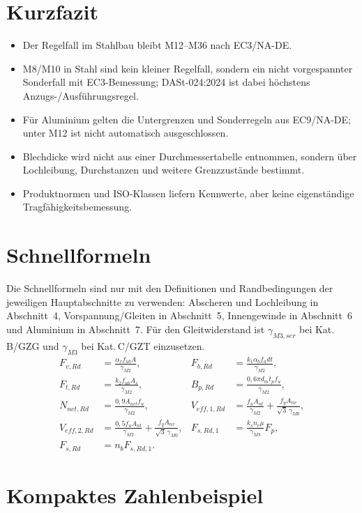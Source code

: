 \documentclass[10pt,a4paper]{article}
\begin{document}
\section{Kurzfazit}
\begin{itemize}
\item Der Regelfall im Stahlbau bleibt M12--M36 nach EC3/NA-DE.
\item M8/M10 in Stahl sind kein kleiner Regelfall, sondern ein nicht vorgespannter Sonderfall mit EC3-Bemessung; DASt-024:2024 ist dabei höchstens Anzugs-/Ausführungsregel.
\item Für Aluminium gelten die Untergrenzen und Sonderregeln aus EC9/NA-DE; unter M12 ist nicht automatisch ausgeschlossen.
\item Blechdicke wird nicht aus einer Durchmessertabelle entnommen, sondern über Lochleibung, Durchstanzen und weitere Grenzzustände bestimmt.
\item Produktnormen und ISO-Klassen liefern Kennwerte, aber keine eigenständige Tragfähigkeitsbemessung.
\end{itemize}

\appendix
\section{Schnellformeln}
Die Schnellformeln sind nur mit den Definitionen und Randbedingungen der jeweiligen Hauptabschnitte zu verwenden: Abscheren und Lochleibung in Abschnitt~4, Vorspannung/Gleiten in Abschnitt~5, Innengewinde in Abschnitt~6 und Aluminium in Abschnitt~7. Für den Gleitwiderstand ist $\gamma_{M3,ser}$ bei Kat.\,B/GZG und $\gamma_{M3}$ bei Kat.\,C/GZT einzusetzen.
\begin{align*}
F_{v,Rd}&=\frac{\alpha_v f_{ub}A}{\gamma_{M2}}, &
F_{b,Rd}&=\frac{k_1\alpha_b f_u d t}{\gamma_{M2}},\\
F_{t,Rd}&=\frac{k_2 f_{ub}A_s}{\gamma_{M2}}, &
B_{p,Rd}&=\frac{0{,}6\pi d_m t_p f_u}{\gamma_{M2}},\\
N_{net,Rd}&=\frac{0{,}9A_{net}f_u}{\gamma_{M2}}, &
V_{eff,1,Rd}&=\frac{f_u A_{nt}}{\gamma_{M2}}+\frac{f_y A_{nv}}{\sqrt{3}\,\gamma_{M0}},\\
V_{eff,2,Rd}&=\frac{0{,}5 f_u A_{nt}}{\gamma_{M2}}+\frac{f_y A_{nv}}{\sqrt{3}\,\gamma_{M0}}, &
F_{s,Rd,1}&=\frac{k_s n_r\mu}{\gamma_{M3}}F_p,\\
F_{s,Rd}&=n_b F_{s,Rd,1}.
\end{align*}


\section{Kompaktes Zahlenbeispiel}
\end{document}
